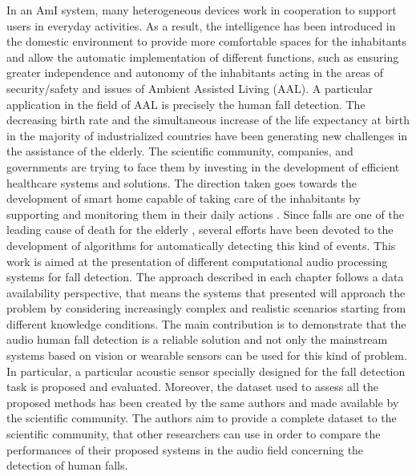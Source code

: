 In an AmI system, many heterogeneous devices work in cooperation to support users in everyday activities. As a result, the intelligence has been introduced in the domestic environment to provide more comfortable spaces for the inhabitants and allow the automatic implementation of different functions, such as ensuring greater independence and autonomy of the inhabitants acting in the areas of security/safety and issues of Ambient Assisted Living (AAL). A particular application in the field of AAL is precisely the human fall detection. 
The decreasing birth rate \cite{eurostat} and the simultaneous increase of the life expectancy at birth \cite{Carone2006} in the majority of industrialized countries have been generating new challenges in the assistance of the elderly. The scientific community, companies, and governments are trying to face them by investing in the development of efficient healthcare systems and solutions. The direction taken goes towards the development of smart home capable of taking care of the inhabitants by supporting and monitoring them in their daily actions \cite{Dawadi20161188, Principi2015a}. Since falls are one of the leading cause of death for the elderly \cite{mubashir2013survey}, several efforts have been devoted to the development of algorithms for automatically detecting this kind of events.
This work is aimed at the presentation of different computational audio processing systems for fall detection. The approach described in each chapter follows a data availability perspective, that means the systems that presented will approach the problem by considering increasingly complex and realistic scenarios starting from different knowledge conditions. The main contribution is to demonstrate that the audio human fall detection is a reliable solution and not only the mainstream systems based on vision or wearable sensors can be used for this kind of problem. In particular, a particular acoustic sensor specially designed for the fall detection task is proposed and evaluated. Moreover, the dataset used to assess all the proposed methods has been created by the same authors and made available by the scientific community. The authors aim to provide a complete dataset to the scientific community, that other researchers can use in order to compare the performances of their proposed systems in the audio field concerning the detection of human falls. 

